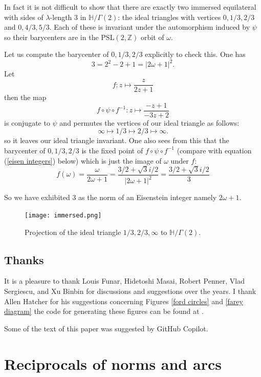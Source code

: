 \documentclass[12pt]{amsart}
\theoremstyle{plain}
\theoremstyle{definition}
\def\HH{\mathbb{H}}
\def\xx{\HH/g2}
\def\ZZ{\mathbb{Z}}
\def\sl2{\mathrm{PSL}(2, \ZZ)}
\def\g2{\Gamma(2)}
\def\xx{\HH/\g2}
\begin{document}
In fact it is not difficult to show that there
are exactly two immersed equilateral 
with sides of  $\lambda$-length $3$ in $\xx$:
the  ideal triangles with vertices $0,1/3,2/3$ 
and   $0,4/3,5/3$.
Each of these is invariant under the 
automorphism induced by $\psi$
so their barycenters are in the $\sl2$ orbit 
of $\omega$.


Let us compute the barycenter of $0,1/3,2/3$ explicitly to check this. 
One has
$$3 = 2^2 - 2 + 1 = | 2\omega + 1 |^2.$$
Let
$$f :  z \mapsto \frac{z}{2z+1}$$
then the map
$$ f \circ \psi \circ f^{-1} :  z \mapsto \frac{-z+ 1}{-3z+2}$$
is conjugate to $\psi$ and permutes the vertices of our ideal
triangle as follows:
$$ \infty \mapsto 1/3 \mapsto 2/3 \mapsto \infty.$$
so it leaves our ideal triangle invariant.
One also sees from this that the barycenter of $0,1/3,2/3$
is the fixed point of $f \circ \psi \circ f^{-1}$ 
(compare with equation (\ref{eisen integers}) below)
which is just the image of $\omega$ under $f$:
$$ f(\omega) = \frac{\omega}{2\omega+1} 
= \frac{3/ 2+ \sqrt{3}i/2 }{|2 \omega + 1 |^2}
= \frac{3/ 2+ \sqrt{3}i/2 }{3}
$$

So we have exhibited $3$ as the norm of an Eisenstein integer namely
$2\omega + 1$. 


\begin{figure}[h]
\begin{center}
\texttt{[image: immersed.png]} 
\end{center}
\caption{Projection of  the ideal triangle $1/3, 2/3,\infty$
to $\xx$.}
	\label{immersed triangle}
\end{figure}

 
\subsection{Thanks}

It is a pleasure to thank Louis Funar, Hidetoshi Masai, Robert
Penner, Vlad Sergiescu, and Xu Binbin for discussions and
suggestions over the years. I thank Allen Hatcher for his
suggestions concerning Figures 
 \ref{ford circles} 
and \ref{farey diagram} the code for generating these figures can be
found at \cite{macbuse}.

Some of the text of this paper was suggested by GitHub
Copilot\cite{copilot, vim_copilot}.

\section{Reciprocals of norms and arcs}
\end{document}
